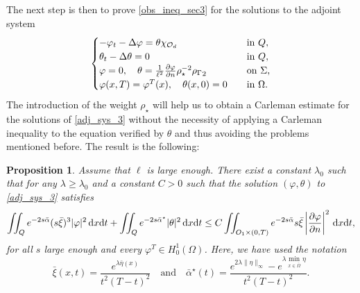 \documentclass{dcds-bOF}
\newtheorem{proposition}{Proposition}
\theoremstyle{definition}
\def\csbd{\rho_{\Gamma}}
\def\dx{\,\textnormal{d}x}
\def\dt{\textnormal{d}t}
\begin{document}
The next step is then to prove \eqref{obs_ineq_sec3} for the solutions to the adjoint system
%
\begin{equation}\label{adj_sys_3}
\begin{cases}
-\varphi_t-\Delta \varphi= \theta\chi_{\mathcal O_d} \quad&\textnormal{in }Q, \\
\theta_t-\Delta \theta=0 \quad& \textnormal{in }Q, \\
\varphi=0, \quad \theta=\frac{1}{\ell^2}\frac{\partial \varphi}{\partial n}\rho_{\star}^{-2}{\csbd}_2 \quad &\textnormal{on $\Sigma$,} \\
\varphi(x,T)=\varphi^T(x), \quad \theta(x,0)=0 \quad &\textnormal{in $\Omega$}.
\end{cases}
\end{equation}
%
The introduction of the weight $\rho_\star$ will help us to obtain a Carleman estimate for the solutions of \eqref{adj_sys_3} without the necessity of applying a Carleman inequality to the equation verified by $\theta$ and thus avoiding the problems mentioned before. The result is the following:
%
\begin{proposition}\label{prop_4_final}
%
Assume that $\ell$ is large enough. There exist a constant $\lambda_0$ such that for any $\lambda\geq \lambda_0$ and a constant $C>0$ such that the solution $(\varphi,\theta)$ to \eqref{adj_sys_3} satisfies
%
\begin{equation}\label{car_final_sec3}
\iint_{Q}e^{-2s\bar\alpha}(s\bar\xi)^3|\varphi|^2\dx\dt+\iint_{Q}e^{-2s\bar\alpha^\star}|\theta|^2\dx\dt\leq C\iint_{\mathcal \mathcal O_1\times(0,T)}e^{-2s\bar\alpha}s\bar\xi\left|\frac{\partial \varphi}{\partial n}\right|^2\dx\dt,
\end{equation}
%
for all $s$ large enough and every $\varphi^T\in H_0^1(\Omega)$. Here, we have used the notation
%
\begin{equation*}
\bar\xi(x,t)=\frac{e^{\lambda\bar\eta(x)}}{t^2(T-t)^2} \quad\text{and}\quad \bar\alpha^\star(t)=\frac{e^{2\lambda\|\eta\|_\infty}-e^{\lambda\min_{x\in \overline\Omega}\eta}}{t^2(T-t)^2}.
\end{equation*}
%
\end{proposition}
%
\end{document}
